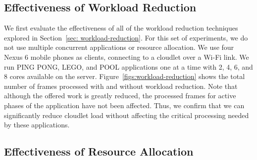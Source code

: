 \subsection{Effectiveness of Workload Reduction}
We first evaluate the effectiveness of all of the workload reduction
techniques explored in Section~\ref{sec: workload-reduction}. For this
set of experiments, we do not use multiple concurrent applications or
resource allocation. We use four Nexus 6 mobile phones as clients,
connecting to a cloudlet over a Wi-Fi link. We run PING PONG, LEGO,
and POOL applications one at a time with 2, 4, 6, and 8 cores
available on the server. Figure~\ref{figs:workload-reduction} shows
the total number of frames processed with and without workload
reduction. Note that although the offered work is greatly reduced, the
processed frames for active phases of the application have not been
affected. Thus, we confirm that we can significantly reduce cloudlet
load without affecting the critical processing needed by these
applications.


\subsection{Effectiveness of Resource Allocation}

